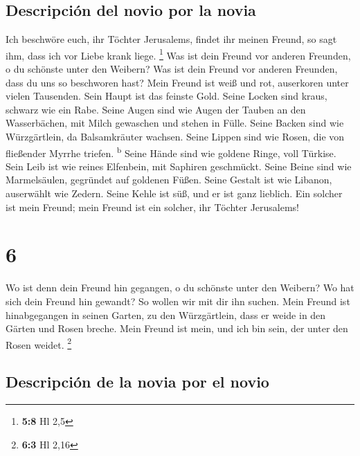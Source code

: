 \hypertarget{descripciuxf3n-del-novio-por-la-novia}{%
\subsection{Descripción del novio por la
novia}\label{descripciuxf3n-del-novio-por-la-novia}}

 Ich beschwöre euch, ihr Töchter Jerusalems, findet ihr
meinen Freund, so sagt ihm, dass ich vor Liebe krank liege. \footnote{\textbf{5:8}
  Hl 2,5}  Was ist dein Freund vor anderen Freunden, o du
schönste unter den Weibern? Was ist dein Freund vor anderen Freunden,
dass du uns so beschworen hast?  Mein Freund ist weiß und
rot, auserkoren unter vielen Tausenden.  Sein Haupt ist
das feinste Gold. Seine Locken sind kraus, schwarz wie ein Rabe.
 Seine Augen sind wie Augen der Tauben an den
Wasserbächen, mit Milch gewaschen und stehen in Fülle. 
Seine Backen sind wie Würzgärtlein, da Balsamkräuter wachsen. Seine
Lippen sind wie Rosen, die von fließender Myrrhe triefen.
\textsuperscript{b}  Seine Hände sind wie goldene Ringe,
voll Türkise. Sein Leib ist wie reines Elfenbein, mit Saphiren
geschmückt.  Seine Beine sind wie Marmelsäulen, gegründet
auf goldenen Füßen. Seine Gestalt ist wie Libanon, auserwählt wie
Zedern.  Seine Kehle ist süß, und er ist ganz lieblich.
Ein solcher ist mein Freund; mein Freund ist ein solcher, ihr Töchter
Jerusalems!

\hypertarget{section-5}{%
\section{6}\label{section-5}}

 Wo ist denn dein Freund hin gegangen, o du schönste unter
den Weibern? Wo hat sich dein Freund hin gewandt? So wollen wir mit dir
ihn suchen.  Mein Freund ist hinabgegangen in seinen
Garten, zu den Würzgärtlein, dass er weide in den Gärten und Rosen
breche.  Mein Freund ist mein, und ich bin sein, der unter
den Rosen weidet. \footnote{\textbf{6:3} Hl 2,16}

\hypertarget{descripciuxf3n-de-la-novia-por-el-novio-1}{%
\subsection{Descripción de la novia por el
novio}\label{descripciuxf3n-de-la-novia-por-el-novio-1}}

